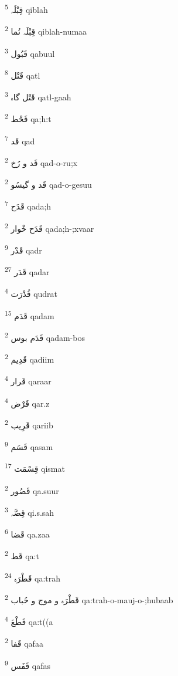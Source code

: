 \documentclass[12pt]{article}
\begin{document}
\begin{RTL}
\begin{multicols}{5}
{\ur قِبْلَہ}   \textsuperscript{5} qiblah

{\ur قِبْلَہ نُما}   \textsuperscript{2} qiblah-numaa

{\ur قَبُول}   \textsuperscript{3} qabuul

{\ur قَتْل}   \textsuperscript{8} qatl

{\ur قَتْل گاہ}   \textsuperscript{3} qatl-gaah

{\ur قَحْط}   \textsuperscript{2} qa;h:t

{\ur قَد}   \textsuperscript{7} qad

{\ur قَد و رُخ}   \textsuperscript{2} qad-o-ru;x

{\ur قَد و گیسُو}   \textsuperscript{2} qad-o-gesuu

{\ur قَدَح}   \textsuperscript{7} qada;h

{\ur قَدَح خْوار}   \textsuperscript{2} qada;h-;xvaar

{\ur قَدْر}   \textsuperscript{9} qadr

{\ur قَدَر}   \textsuperscript{27} qadar

{\ur قُدْرَت}   \textsuperscript{4} qudrat

{\ur قَدَم}   \textsuperscript{15} qadam

{\ur قَدَم بوس}   \textsuperscript{2} qadam-bos

{\ur قَدِیم}   \textsuperscript{2} qadiim

{\ur قَرار}   \textsuperscript{4} qaraar

{\ur قَرْض}   \textsuperscript{4} qar.z

{\ur قَرِیب}   \textsuperscript{2} qariib

{\ur قَسَم}   \textsuperscript{9} qasam

{\ur قِسْمَت}   \textsuperscript{17} qismat

{\ur قَصُور}   \textsuperscript{2} qa.suur

{\ur قِصَّہ}   \textsuperscript{3} qi.s.sah

{\ur قَضا}   \textsuperscript{6} qa.zaa

{\ur قَط}   \textsuperscript{2} qa:t

{\ur قَطْرَہ}   \textsuperscript{24} qa:trah

{\ur قَطْرَہ و موج و حُباب}   \textsuperscript{2} qa:trah-o-mauj-o-;hubaab

{\ur قَطْعَ}   \textsuperscript{4} qa:t((a

{\ur قَفا}   \textsuperscript{2} qafaa

{\ur قَفَس}   \textsuperscript{9} qafas


\end{multicols}
\end{RTL}
\end{document}
